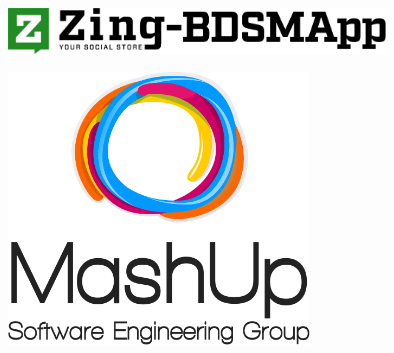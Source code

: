 %



\thispagestyle{empty}
\setlength{\topmargin}{-60pt}
\begin{figure}[!t]
	\centering
	\includegraphics[width=10cm]{../template/images/logo/zing.pdf}
\end{figure}
\vspace{1pt}
\begin{figure}[!t]
	\centering
	\includegraphics[width=8cm]{../template/images/logo/logo_verticale.pdf}
\end{figure}

\begin{center}
 	\groupEmail
\end{center}

